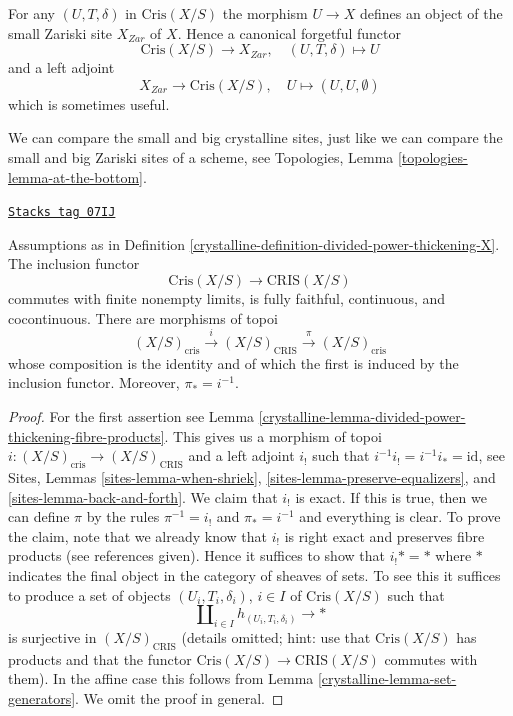 For any $(U, T, \delta)$ in $\text{Cris}(X/S)$ the morphism $U \to X$
defines an object of the small Zariski site $X_{Zar}$ of $X$. Hence
a canonical forgetful functor
\begin{equation}
\label{equation-forget-small}
\text{Cris}(X/S) \longrightarrow X_{Zar},\quad
(U, T, \delta) \longmapsto U
\end{equation}
and a left adjoint
\begin{equation}
\label{equation-endow-trivial-small}
X_{Zar} \longrightarrow \text{Cris}(X/S),\quad
U \longmapsto (U, U, \emptyset)
\end{equation}
which is sometimes useful.

\medskip\noindent
We can compare the small and big crystalline sites, just like
we can compare the small and big Zariski sites of a scheme, see
Topologies, Lemma \ref{topologies-lemma-at-the-bottom}.

\begin{lemma}
\label{crystalline-lemma-compare-big-small}
\href{https://stacks.math.columbia.edu/tag/07IJ}{\texttt{Stacks tag 07IJ}}

Assumptions as in Definition \ref{crystalline-definition-divided-power-thickening-X}.
The inclusion functor
$$
\text{Cris}(X/S) \to \text{CRIS}(X/S)
$$
commutes with finite nonempty limits, is fully faithful, continuous,
and cocontinuous. There are morphisms of topoi
$$
(X/S)_{\text{cris}} \xrightarrow{i} (X/S)_{\text{CRIS}}
\xrightarrow{\pi} (X/S)_{\text{cris}}
$$
whose composition is the identity and of which the first is induced
by the inclusion functor. Moreover, $\pi_* = i^{-1}$.
\end{lemma}

\begin{proof}

For the first assertion see
Lemma \ref{crystalline-lemma-divided-power-thickening-fibre-products}.
This gives us a morphism of topoi
$i : (X/S)_{\text{cris}} \to (X/S)_{\text{CRIS}}$ and a left adjoint
$i_!$ such that $i^{-1}i_! = i^{-1}i_* = \text{id}$, see
Sites, Lemmas \ref{sites-lemma-when-shriek},
\ref{sites-lemma-preserve-equalizers}, and
\ref{sites-lemma-back-and-forth}.
We claim that $i_!$ is exact. If this is true, then we can define
$\pi$ by the rules $\pi^{-1} = i_!$ and $\pi_* = i^{-1}$
and everything is clear. To prove the claim, note that we already know
that $i_!$ is right exact and preserves fibre products (see references
given). Hence it suffices to show that $i_! * = *$ where $*$ indicates
the final object in the category of sheaves of sets.
To see this it suffices to produce a set of objects
$(U_i, T_i, \delta_i)$, $i \in I$ of $\text{Cris}(X/S)$ such that
$$
\coprod\nolimits_{i \in I} h_{(U_i, T_i, \delta_i)} \to *
$$
is surjective in $(X/S)_{\text{CRIS}}$ (details omitted; hint: use that
$\text{Cris}(X/S)$ has products and that the functor
$\text{Cris}(X/S) \to \text{CRIS}(X/S)$ commutes with them).
In the affine case this
follows from Lemma \ref{crystalline-lemma-set-generators}. We omit the proof
in general.
\end{proof}

